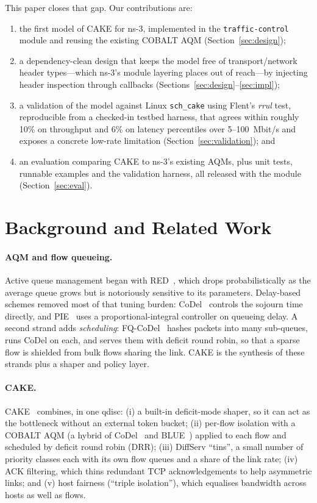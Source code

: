 \documentclass[sigconf,nonacm]{acmart}
\begin{document}
This paper closes that gap. Our contributions are:
\begin{enumerate}
  \item the first model of CAKE for ns-3, implemented in the
        \texttt{traffic-control} module and reusing the existing COBALT AQM
        (Section~\ref{sec:design});
  \item a dependency-clean design that keeps the model free of transport/network
        header types---which ns-3's module layering places out of reach---by
        injecting header inspection through callbacks
        (Sections~\ref{sec:design}--\ref{sec:impl});
  \item a validation of the model against Linux \texttt{sch\_cake} using Flent's
        \emph{rrul} test, reproducible from a checked-in testbed harness, that
        agrees within roughly 10\% on throughput and 6\% on latency percentiles
        over 5--100~Mbit/s and exposes a concrete low-rate limitation
        (Section~\ref{sec:validation}); and
  \item an evaluation comparing CAKE to ns-3's existing AQMs, plus unit tests,
        runnable examples and the validation harness, all released with the
        module (Section~\ref{sec:eval}).
\end{enumerate}

\section{Background and Related Work}
\label{sec:background}

\paragraph{AQM and flow queueing.} Active queue management began with
RED~\cite{red}, which drops probabilistically as the average queue grows but is
notoriously sensitive to its parameters. Delay-based schemes removed most of
that tuning burden: CoDel~\cite{codel} controls the sojourn time directly, and
PIE~\cite{rfc8033} uses a proportional-integral controller on queueing delay.
A second strand adds \emph{scheduling}: FQ-CoDel~\cite{rfc8290} hashes packets
into many sub-queues, runs CoDel on each, and serves them with deficit round
robin, so that a sparse flow is shielded from bulk flows sharing the link.
CAKE is the synthesis of these strands plus a shaper and policy layer.

\paragraph{CAKE.} CAKE~\cite{cake} combines, in one qdisc: (i) a built-in
deficit-mode shaper, so it can act as the bottleneck without an external token
bucket; (ii) per-flow isolation with a COBALT AQM (a hybrid of CoDel~\cite{codel}
and BLUE~\cite{blue}) applied to each flow and scheduled by deficit round robin
(DRR); (iii) DiffServ ``tins'', a small number of priority classes each with its
own flow queues and a share of the link rate; (iv) ACK filtering, which thins
redundant TCP acknowledgements to help asymmetric links; and (v) host fairness
(``triple isolation''), which equalises bandwidth across hosts as well as flows.
\end{document}
